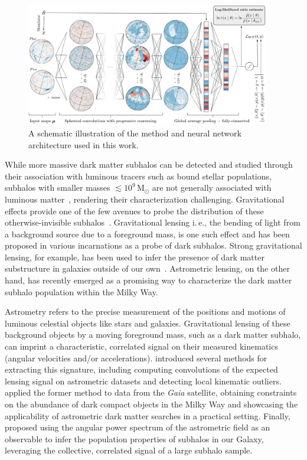 \documentclass[twocolumn,linenumbers,anonymous]{aastex631}
\newcommand{\ie}{{i.\,e.}\xspace}
\begin{document}
\begin{figure}[!htbp]
\centering
\includegraphics[width=0.95\textwidth]{summary.pdf}
\caption{A schematic illustration of the method and neural network architecture used in this work.}
\label{fig:model}
\end{figure}

While more massive dark matter subhalos can be detected and studied through their association with luminous tracers such as bound stellar populations, subhalos with smaller masses $\lesssim 10^9\,\mathrm M_\odot$ are not generally associated with luminous matter~\citep{Fitts:2016usl,2017MNRAS.467.2019R}, rendering their characterization challenging. Gravitational effects provide one of the few avenues to probe the distribution of these otherwise-invisible subhalos~\citep{Buckley:2017ijx}. Gravitational lensing \ie, the bending of light from a background source due to a foreground mass, is one such effect and has been proposed in various incarnations as a probe of dark subhalos. 
Strong gravitational lensing, for example, has been used to infer the presence of dark matter substructure in galaxies outside of our own~\citep{Hezaveh:2016ltk,Vegetti:2009cz,Gilman:2019nap,Vegetti:2012mc}.
Astrometric lensing, on the other hand, has recently emerged as a promising way to characterize the dark matter subhalo population within the Milky Way.

Astrometry refers to the precise measurement of the positions and motions of luminous celestial objects like stars and galaxies. Gravitational lensing of these background objects by a moving foreground mass, such as a dark matter subhalo, can imprint a characteristic, correlated signal on their measured kinematics (angular velocities and/or accelerations). \citet{VanTilburg:2018ykj} introduced several methods for extracting this signature, including computing convolutions of the expected lensing signal on astrometric datasets and detecting local kinematic outliers. \citet{Mondino:2020rkn} applied the former method to data from the \emph{Gaia} satellite, obtaining constraints on the abundance of dark compact objects in the Milky Way and showcasing the applicability of astrometric dark matter searches in a practical setting. Finally, \citet{Mishra-Sharma:2020ynk} proposed using the angular power spectrum of the astrometric field as an observable to infer the population properties of subhalos in our Galaxy, leveraging the collective, correlated signal of a large subhalo sample. 
\end{document}
